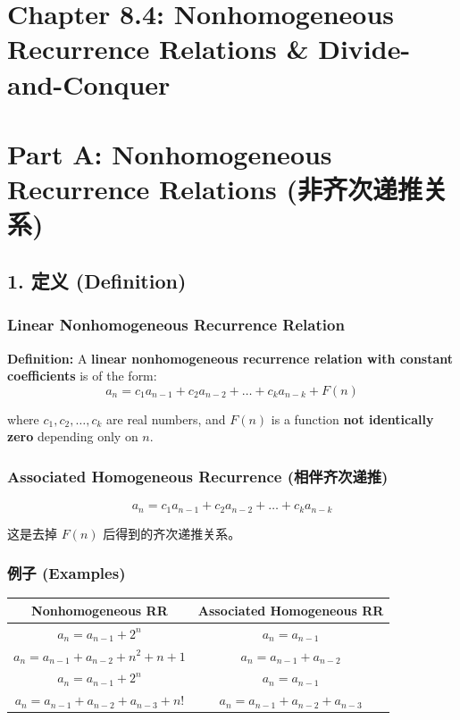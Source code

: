 \documentclass[10pt,a4paper,openany]{ctexbook}
\theoremstyle{definition}
\theoremstyle{remark}
\begin{document}
\section{Chapter 8.4: Nonhomogeneous Recurrence Relations \& Divide-and-Conquer}

\vspace{-2pt}

\section{Part A: Nonhomogeneous Recurrence Relations (非齐次递推关系)}

\subsection{1. 定义 (Definition)}

\subsubsection{Linear Nonhomogeneous Recurrence Relation}

\textbf{Definition:} A \textbf{linear nonhomogeneous recurrence relation with constant coefficients} is of the form:
\[
a_n = c_1 a_{n-1} + c_2 a_{n-2} + \dots + c_k a_{n-k} + F(n)
\]

where $c_1, c_2, \dots, c_k$ are real numbers, and $F(n)$ is a function \textbf{not identically zero} depending only on $n$.
\subsubsection{Associated Homogeneous Recurrence (相伴齐次递推)}

\[
a_n = c_1 a_{n-1} + c_2 a_{n-2} + \dots + c_k a_{n-k}
\]

这是去掉 $F(n)$ 后得到的齐次递推关系。
\subsubsection{例子 (Examples)}

\begin{center}
\begin{tabular}{cc}
\hline
Nonhomogeneous RR & Associated Homogeneous RR \\ \hline
$a_n = a_{n-1} + 2^n$ & $a_n = a_{n-1}$ \\
$a_n = a_{n-1} + a_{n-2} + n^2 + n + 1$ & $a_n = a_{n-1} + a_{n-2}$ \\
$a_n = a_{n-1} + 2^n$ & $a_n = a_{n-1}$ \\
$a_n = a_{n-1} + a_{n-2} + a_{n-3} + n!$ & $a_n = a_{n-1} + a_{n-2} + a_{n-3}$ \\
\hline
\end{tabular}

\end{center}
\end{document}
